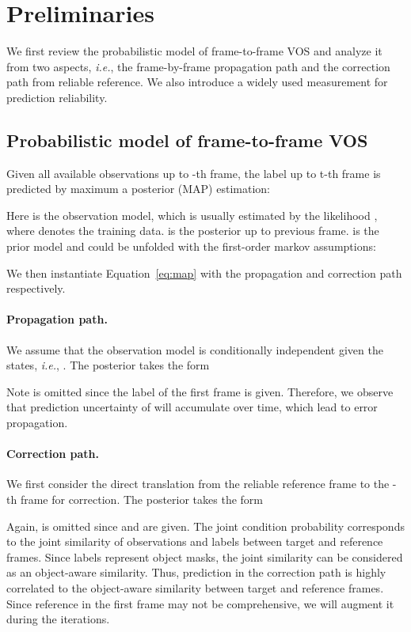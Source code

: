 \documentclass[letterpaper]{article} \usepackage{aaai22}  \usepackage{times}  \usepackage{helvet}  \usepackage{courier}  \usepackage[hyphens]{url}  \usepackage{graphicx} \urlstyle{rm} \def\UrlFont{\rm}  \usepackage{natbib}  \usepackage{caption} \DeclareCaptionStyle{ruled}{labelfont=normalfont,labelsep=colon,strut=off} \frenchspacing  \setlength{\pdfpagewidth}{8.5in}  \setlength{\pdfpageheight}{11in}  \usepackage{algorithm}
\def\ie{\textit{i.e.}}
\newcommand{\eqn}[1]{Equation~#1}
\begin{document}
\section{Preliminaries}
We first review the probabilistic model of frame-to-frame VOS and analyze it from two aspects, \ie, the frame-by-frame propagation path and the correction path from reliable reference. We also introduce a widely used measurement for prediction reliability.

\subsection{Probabilistic model of frame-to-frame VOS}
Given all available observations  up to -th frame, the label up to t-th frame  is predicted by maximum a posterior (MAP) estimation:

\begin{small}
    
\end{small}

Here  is the observation model, which is usually estimated by the likelihood , where  denotes the training data. 
 is the posterior up to previous frame.
 is the prior model and could be unfolded with the first-order markov assumptions:
\begin{small}
    
\end{small}
We then instantiate \eqn{\ref{eq:map}} with the propagation and correction path respectively.
\paragraph{Propagation path.}
We assume that the observation model is conditionally independent given the states, \ie, . The posterior takes the form
\begin{small}

\end{small}
Note  is omitted since the label of the first frame  is given.
Therefore, we observe that prediction uncertainty of  will accumulate over time, which lead to error propagation.

\paragraph{Correction path.}
We first consider the direct translation from the reliable reference frame  to the -th frame  for correction. The posterior takes the form
\begin{small}

\end{small}
Again,  is omitted since  and  are given. The joint condition probability  corresponds to the joint similarity of observations and labels between target and reference frames. Since labels represent object masks, the joint similarity can be considered as an object-aware similarity. Thus, prediction in the correction path is highly correlated to the object-aware similarity between target and reference frames. Since reference in the first frame may not be comprehensive, we will augment it during the iterations.
\end{document}
